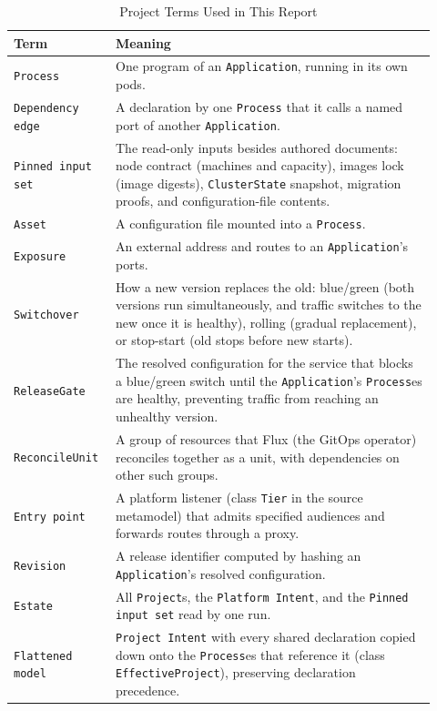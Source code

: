 \begin{table}[!htbp]
\centering
\begin{tabular}{>{\raggedright\arraybackslash}p{0.2\linewidth}>{\raggedright\arraybackslash}p{0.72\linewidth}}
\hline
\textbf{Term} & \textbf{Meaning} \\
\hline
\texttt{Process} & One program of an \texttt{Application}, running in its own pods. \\
\texttt{Dependency edge} & A declaration by one \texttt{Process} that it calls a named port of another \texttt{Application}. \\
\texttt{Pinned input set} & The read-only inputs besides authored documents: node contract (machines and capacity), images lock (image digests), \texttt{ClusterState} snapshot, migration proofs, and configuration-file contents. \\
\texttt{Asset} & A configuration file mounted into a \texttt{Process}. \\
\texttt{Exposure} & An external address and routes to an \texttt{Application}'s ports. \\
\texttt{Switchover} & How a new version replaces the old: blue/green (both versions run simultaneously, and traffic switches to the new once it is healthy), rolling (gradual replacement), or stop-start (old stops before new starts). \\
\texttt{ReleaseGate} & The resolved configuration for the service that blocks a blue/green switch until the \texttt{Application}'s \texttt{Process}es are healthy, preventing traffic from reaching an unhealthy version. \\
\texttt{ReconcileUnit} & A group of resources that Flux (the GitOps operator) reconciles together as a unit, with dependencies on other such groups. \\
\texttt{Entry point} & A platform listener (class \texttt{Tier} in the source metamodel) that admits specified audiences and forwards routes through a proxy. \\
\texttt{Revision} & A release identifier computed by hashing an \texttt{Application}'s resolved configuration. \\
\texttt{Estate} & All \texttt{Project}s, the \texttt{Platform Intent}, and the \texttt{Pinned input set} read by one run. \\
\texttt{Flattened model} & \texttt{Project Intent} with every shared declaration copied down onto the \texttt{Process}es that reference it (class \texttt{EffectiveProject}), preserving declaration precedence. \\
\hline
\end{tabular}
\caption{Project Terms Used in This Report}
\label{tab:terms}
\end{table}

